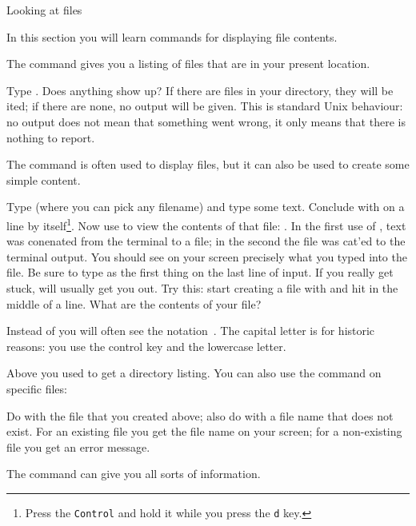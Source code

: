  {Looking at files}

\begin{purpose}
In this section you will learn commands for displaying file contents.
\end{purpose}

The  command gives you a listing of files that are in your
present location. 

\practical
{Type . Does anything show up?}
{If there are files in your directory, they will be ited; if
  there are none, no output will be given. This is standard Unix
  behaviour: no output does not mean that something went wrong, it
  only means that there is nothing to report.}{}

The  command is often used to display files, but it can also be
used to create some simple content. 

\practical
{Type  (where you can pick any
  filename) and type some text. Conclude with 
  on a line by itself\footnote 
  {Press the \texttt{Control} and hold it while you press the \texttt{d} key.}.
  Now use  to view the contents of that file: .}
{In the first use of , text was conenated from the
  terminal to a file; in the second the file was cat'ed to the
  terminal output. You should see on your screen precisely what you
  typed into the file.}
{Be sure to type  as the first thing on the last line of input. If you
  really get stuck,  will usually get you out. Try this:
  start creating a file with  and hit  in
  the middle of a line. What are the contents of your file?}

  \begin{remark}
  Instead of  you will often see the notation~. 
  The capital letter is for historic reasons: you use the control key
  and the lowercase letter.
  \end{remark}

Above you used  to get a directory listing. You can also use the
 command on specific files: 

\practical
{Do  with the file that you created above; also do
   with a file name that does not exist.}
{For an existing file you get the file name on your screen; for a
  non-existing file you get an error message.}
{}

The  command can give you all sorts of information.

